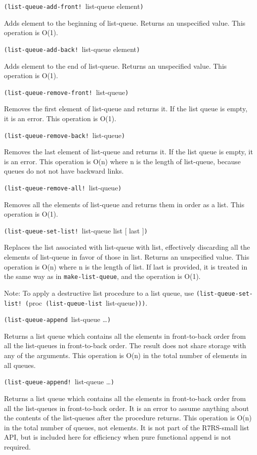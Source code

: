 \texttt{(list-queue-add-front!\ }list-queue element\texttt{)}

Adds element to the beginning of list-queue. Returns an unspecified
value. This operation is O(1).

\texttt{(list-queue-add-back!\ }list-queue element\texttt{)}

Adds element to the end of list-queue. Returns an unspecified value.
This operation is O(1).

\texttt{(list-queue-remove-front!\ }list-queue\texttt{)}

Removes the first element of list-queue and returns it. If the list
queue is empty, it is an error. This operation is O(1).

\texttt{(list-queue-remove-back!\ }list-queue\texttt{)}

Removes the last element of list-queue and returns it. If the list queue
is empty, it is an error. This operation is O(n) where n is the length
of list-queue, because queues do not not have backward links.

\texttt{(list-queue-remove-all!\ }list-queue\texttt{)}

Removes all the elements of list-queue and returns them in order as a
list. This operation is O(1).

\texttt{(list-queue-set-list!\ }list-queue list {[} last {]}\texttt{)}

Replaces the list associated with list-queue with list, effectively
discarding all the elements of list-queue in favor of those in list.
Returns an unspecified value. This operation is O(n) where n is the
length of list. If last is provided, it is treated in the same way as in
\texttt{make-list-queue}, and the operation is O(1).

Note: To apply a destructive list procedure to a list queue, use
\texttt{(list-queue-set-list!\ (}proc\texttt{\ (list-queue-list\ }list-queue\texttt{)))}.

\texttt{(list-queue-append\ }list-queue \ldots{}\texttt{)}

Returns a list queue which contains all the elements in front-to-back
order from all the list-queues in front-to-back order. The result does
not share storage with any of the arguments. This operation is O(n) in
the total number of elements in all queues.

\texttt{(list-queue-append!\ }list-queue \ldots{}\texttt{)}

Returns a list queue which contains all the elements in front-to-back
order from all the list-queues in front-to-back order. It is an error to
assume anything about the contents of the list-queues after the
procedure returns. This operation is O(n) in the total number of queues,
not elements. It is not part of the R7RS-small list API, but is included
here for efficiency when pure functional append is not required.

